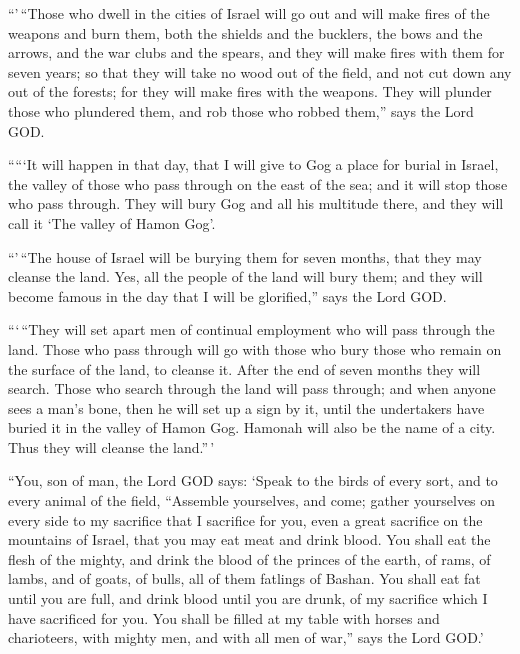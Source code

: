  ``'\,``Those who dwell in the cities of Israel will go out
and will make fires of the weapons and burn them, both the shields and
the bucklers, the bows and the arrows, and the war clubs and the spears,
and they will make fires with them for seven years;  so
that they will take no wood out of the field, and not cut down any out
of the forests; for they will make fires with the weapons. They will
plunder those who plundered them, and rob those who robbed them,'' says
the Lord GOD.

 `````It will happen in that day, that I will give to Gog a
place for burial in Israel, the valley of those who pass through on the
east of the sea; and it will stop those who pass through. They will bury
Gog and all his multitude there, and they will call it `The valley of
Hamon Gog'.

 ``'\,``The house of Israel will be burying them for seven
months, that they may cleanse the land.  Yes, all the
people of the land will bury them; and they will become famous in the
day that I will be glorified,'' says the Lord GOD.

 ```\,``They will set apart men of continual employment who
will pass through the land. Those who pass through will go with those
who bury those who remain on the surface of the land, to cleanse it.
After the end of seven months they will search.  Those who
search through the land will pass through; and when anyone sees a man's
bone, then he will set up a sign by it, until the undertakers have
buried it in the valley of Hamon Gog.  Hamonah will also be
the name of a city. Thus they will cleanse the land.''\,'

 ``You, son of man, the Lord GOD says: `Speak to the birds
of every sort, and to every animal of the field, ``Assemble yourselves,
and come; gather yourselves on every side to my sacrifice that I
sacrifice for you, even a great sacrifice on the mountains of Israel,
that you may eat meat and drink blood.  You shall eat the
flesh of the mighty, and drink the blood of the princes of the earth, of
rams, of lambs, and of goats, of bulls, all of them fatlings of Bashan.
 You shall eat fat until you are full, and drink blood
until you are drunk, of my sacrifice which I have sacrificed for you.
 You shall be filled at my table with horses and
charioteers, with mighty men, and with all men of war,'' says the Lord
GOD.'


